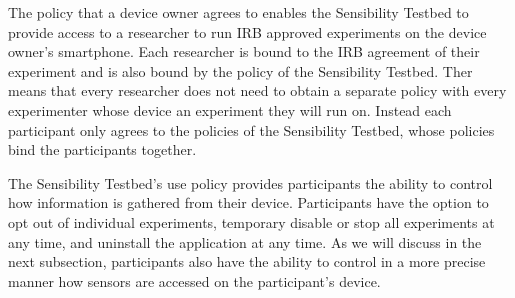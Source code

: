 %
%
%

The policy that a device owner agrees to enables the Sensibility Testbed to
provide access to a researcher to run IRB approved experiments on the device
owner's smartphone.  Each researcher is bound to the IRB agreement of their
experiment and is also bound by the policy of the Sensibility Testbed.  Ther
means that every researcher does not need to obtain a separate policy with
every experimenter whose device an experiment they will run on.  Instead
each participant only agrees to the policies of the Sensibility Testbed, whose
policies bind the participants together.


The Sensibility Testbed's use policy provides participants the ability
to control how information is gathered from their device. Participants
have the option to opt out of individual experiments, temporary
disable or stop all experiments at any time, and uninstall the 
application at any time.  As we will discuss in the next subsection,
participants also have the ability to control in a more precise manner
how sensors are accessed on the participant's device.

